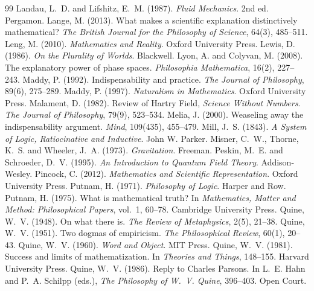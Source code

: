 \documentclass{situationist-preprint}
\begin{document}
\begin{thebibliography}{99}
 Landau, L.~D. and Lifshitz, E.~M. (1987). \emph{Fluid Mechanics}. 2nd ed. Pergamon.
 Lange, M. (2013). What makes a scientific explanation distinctively mathematical? \emph{The British Journal for the Philosophy of Science}, 64(3), 485--511.
 Leng, M. (2010). \emph{Mathematics and Reality}. Oxford University Press.
 Lewis, D. (1986). \emph{On the Plurality of Worlds}. Blackwell.
 Lyon, A. and Colyvan, M. (2008). The explanatory power of phase spaces. \emph{Philosophia Mathematica}, 16(2), 227--243.
 Maddy, P. (1992). Indispensability and practice. \emph{The Journal of Philosophy}, 89(6), 275--289.
 Maddy, P. (1997). \emph{Naturalism in Mathematics}. Oxford University Press.
 Malament, D. (1982). Review of Hartry Field, \emph{Science Without Numbers}. \emph{The Journal of Philosophy}, 79(9), 523--534.
 Melia, J. (2000). Weaseling away the indispensability argument. \emph{Mind}, 109(435), 455--479.
 Mill, J.~S. (1843). \emph{A System of Logic, Ratiocinative and Inductive}. John W. Parker.
 Misner, C.~W., Thorne, K.~S. and Wheeler, J.~A. (1973). \emph{Gravitation}. Freeman.
 Peskin, M.~E. and Schroeder, D.~V. (1995). \emph{An Introduction to Quantum Field Theory}. Addison-Wesley.
 Pincock, C. (2012). \emph{Mathematics and Scientific Representation}. Oxford University Press.
 Putnam, H. (1971). \emph{Philosophy of Logic}. Harper and Row.
 Putnam, H. (1975). What is mathematical truth? In \emph{Mathematics, Matter and Method: Philosophical Papers}, vol.~1, 60--78. Cambridge University Press.
 Quine, W.~V. (1948). On what there is. \emph{The Review of Metaphysics}, 2(5), 21--38.
 Quine, W.~V. (1951). Two dogmas of empiricism. \emph{The Philosophical Review}, 60(1), 20--43.
 Quine, W.~V. (1960). \emph{Word and Object}. MIT Press.
 Quine, W.~V. (1981). Success and limits of mathematization. In \emph{Theories and Things}, 148--155. Harvard University Press.
 Quine, W.~V. (1986). Reply to Charles Parsons. In L.~E. Hahn and P.~A. Schilpp (eds.), \emph{The Philosophy of W.~V. Quine}, 396--403. Open Court.

\end{thebibliography}
\end{document}
